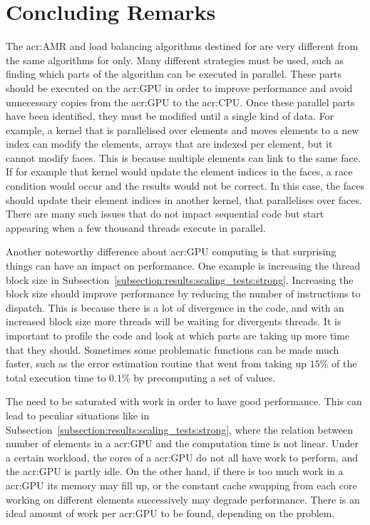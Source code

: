 \section{Concluding Remarks}\label{section:conclusion:remarks}

The \acrshort{acr:AMR} and load balancing algorithms destined for  are very
different from the same algorithms for  only. Many different strategies must be
used, such as finding which parts of the algorithm can be executed in parallel. These parts should
be executed on the \acrshort{acr:GPU} in order to improve performance and avoid unnecessary copies
from the \acrshort{acr:GPU} to the \acrshort{acr:CPU}. Once these parallel parts have been
identified, they must be modified until a single kind of data. For example, a kernel that is
parallelised over elements and moves elements to a new index can modify the elements, arrays that
are indexed per element, but it cannot modify faces. This is because multiple elements can link to
the same face. If for example that kernel would update the element indices in the faces, a race
condition would occur and the results would not be correct. In this case, the faces should update
their element indices in another kernel, that parallelises over faces. There are many such issues
that do not impact sequential code but start appearing when a few thousand threads execute in
parallel.

Another noteworthy difference about \acrshort{acr:GPU} computing is that surprising things can have
an impact on performance. One example is increasing the thread block size in
Subsection~\ref{subsection:results:scaling_tests:strong}. Increasing the block size should improve
performance by reducing the number of instructions to dispatch. This is because there is a lot of
divergence in the code, and with an increased block size more threads will be waiting for divergents
threads. It is important to profile the code and look at which parts are taking up more time that
they should. Sometimes some problematic functions can be made much faster, such as the error
estimation routine that went from taking up \(15 \% \) of the total execution time to \(0.1 \% \) by
precomputing a set of values.

The  need to be saturated with work in order to have good performance. This can
lead to peculiar situations like in Subsection~\ref{subsection:results:scaling_tests:strong}, where
the relation between number of elements in a \acrshort{acr:GPU} and the computation time is not
linear. Under a certain workload, the cores of a \acrshort{acr:GPU} do not all have work to perform,
and the \acrshort{acr:GPU} is partly idle. On the other hand, if there is too much work in a
\acrshort{acr:GPU} its memory may fill up, or the constant cache swapping from each core working on
different elements successively may degrade performance. There is an ideal amount of work per
\acrshort{acr:GPU} to be found, depending on the problem.

